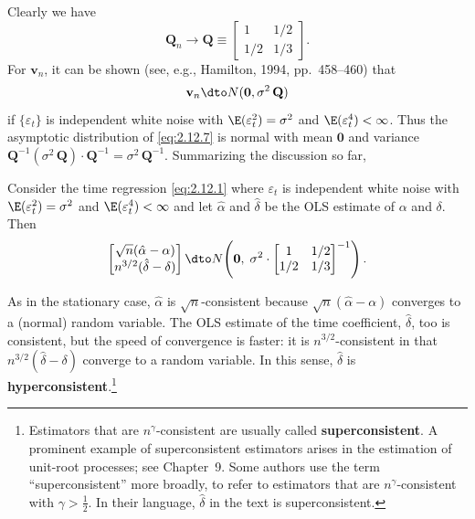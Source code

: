 %
Clearly we have
%
\begin{equation}
\mathbf{Q}_n \to \mathbf{Q} \equiv \begin{bmatrix}
1 & 1/2 \\ 1/2 & 1/3
\end{bmatrix}.
\label{eq:2.12.10}
\end{equation}
%
For $\mathbf{v}_n$, it can be shown (see, e.g., Hamilton, 1994, pp.~458--460) that
%
\begin{equation}
\mathbf{v}_n \dto N(\mathbf{0}, \sigma^2\,\mathbf{Q})
\label{eq:2.12.11}
\end{equation}
%
if $\{\varepsilon_t\}$ is independent white noise with $\E(\varepsilon_t^2) = \sigma^2$ and
$\E(\varepsilon_t^4) < \infty$. Thus the asymptotic distribution of \eqref{eq:2.12.7}
is normal with mean $\mathbf{0}$ and variance
$\mathbf{Q}^{-1}(\sigma^2\,\mathbf{Q}) \cdot \mathbf{Q}^{-1} = \sigma^2\,\mathbf{Q}^{-1}$.
Summarizing the discussion so far,

\begin{proposition}
\label{prop:2.11}
Consider the time regression \eqref{eq:2.12.1} where $\varepsilon_t$ is independent white noise with
$\E(\varepsilon_t^2) = \sigma^2$ and $\E(\varepsilon_t^4) < \infty$ and let $\hat{\alpha}$ and
$\hat{\delta}$ be the OLS estimate of $\alpha$ and $\delta$. Then
\[
\begin{bmatrix}
\sqrt{n}(\hat{\alpha} - \alpha) \\
n^{3/2}(\hat{\delta} - \delta)
\end{bmatrix}
\dto N\!\left(\mathbf{0},\;\sigma^2 \cdot
\begin{bmatrix} 1 & 1/2 \\ 1/2 & 1/3 \end{bmatrix}^{-1}\right).
\]
\end{proposition}

As in the stationary case, $\hat{\alpha}$ is $\sqrt{n}$-consistent because
$\sqrt{n}(\hat{\alpha} - \alpha)$ converges to a (normal) random variable.
The OLS estimate of the time coefficient, $\hat{\delta}$, too is consistent, but the speed of convergence is faster: it is $n^{3/2}$-consistent in that
$n^{3/2}(\hat{\delta} - \delta)$ converge to a random variable. In this sense,
$\hat{\delta}$ is \textbf{hyperconsistent}.\footnote{Estimators that are $n^\gamma$-consistent
are usually called \textbf{superconsistent}. A prominent example of superconsistent estimators
arises in the estimation of unit-root processes; see Chapter~9. Some authors use the
term ``superconsistent'' more broadly, to refer to estimators that are $n^\gamma$-consistent
with $\gamma > \frac{1}{2}$. In their language, $\hat{\delta}$ in the text is superconsistent.}

